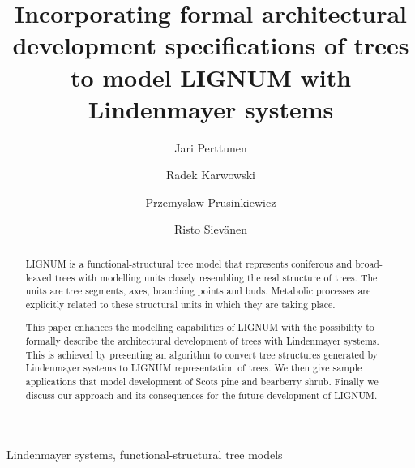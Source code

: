 \documentclass{elsart}
\begin{document}
\begin{frontmatter}


\title{Incorporating formal architectural development specifications of trees to model LIGNUM with Lindenmayer systems}
\author[Metla]{Jari Perttunen}
\author[Calgary]{Radek Karwowski}
\author[Calgary]{Przemyslaw Prusinkiewicz}
\author[Metla]{Risto Siev\"anen}

\address[Metla]{Finnish Forest Research Insititute. Vantaa Research Station. 
                              Jokiniemenkuja 1. PL 18. 01301 Vantaa. Finland.}
\address[Calgary]{University of Calgary}




\begin{abstract}
  LIGNUM  is  a   functional-structural  tree  model  that  represents
  coniferous and broad-leaved trees  with modelling units closely
  resembling  the  real  structure  of  trees.   The  units  are  tree
  segments, axes,  branching  points  and buds.   Metabolic
  processes are  explicitly related to  these structural units  in which
  they are  taking place. 
  
  This paper enhances the modelling capabilities of  LIGNUM with the
  possibility to formally describe  the architectural development of trees 
  with Lindenmayer systems. This is achieved by presenting an algorithm to convert tree 
  structures generated by Lindenmayer systems to LIGNUM representation of trees.
  We then give sample applications that  model development  of Scots pine and bearberry shrub.  
  Finally we discuss our approach  and its consequences for the future development of LIGNUM.  
\end{abstract}

\begin{keyword}

 Lindenmayer systems, functional-structural tree models


\end{keyword}

\end{frontmatter}







\end{document}
